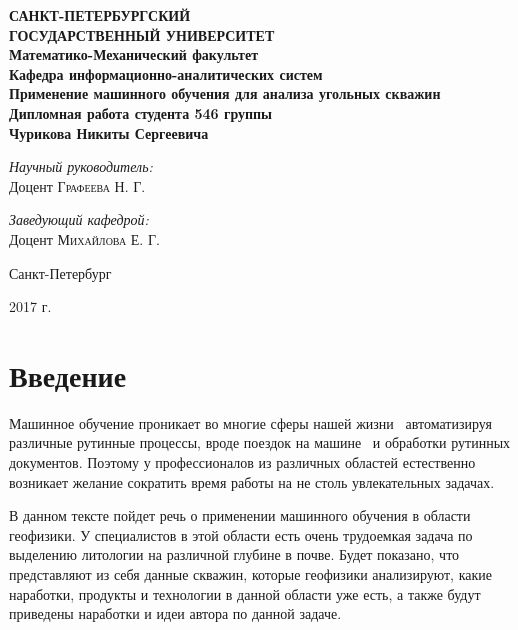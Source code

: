\documentclass[aps,%
12pt,%
final,%
oneside,
onecolumn,%
musixtex, %
superscriptaddress,%
centertags]{article} %
\begin{document}
\begin{titlepage}
\begin{center}
\textbf{\Large САНКТ-ПЕТЕРБУРГСКИЙ \\ ГОСУДАРСТВЕННЫЙ УНИВЕРСИТЕТ} \\[1.0cm]
\textbf{\large Математико-Механический факультет} \\[0.2cm]
\textbf{\large Кафедра информационно-аналитических систем}\\[3.5cm]

\textbf{\LARGE Применение машинного обучения для анализа угольных скважин}\\[1.0cm]
\textbf{\Large Дипломная работа студента 546 группы} \\[0.2cm]
\textbf{\Large Чурикова Никиты Сергеевича} \\[3.5cm]

\begin{flushright} \large
\emph{Научный руководитель:} \\
Доцент \textsc{Графеева Н. Г.}
\end{flushright}
\begin{flushright} \large
\emph{Заведующий кафедрой:} \\
Доцент \textsc{Михайлова Е. Г.}
\end{flushright}
\vfill

{\large {Санкт-Петербург}} \par
{\large {2017 г.}}
\end{center}
\end{titlepage}

\tableofcontents

\section{Введение}
Машинное обучение проникает во многие сферы нашей жизни~\cite{overview-of-ml} автоматизируя
различные рутинные процессы, вроде поездок на машине~\cite{ai-cars} и обработки рутинных документов.
Поэтому у профессионалов из различных областей естественно возникает желание сократить время работы
на не столь увлекательных задачах.

В данном тексте пойдет речь о применении машинного обучения в области геофизики. У специалистов
в этой области есть очень трудоемкая задача по выделению литологии на различной глубине в почве.
Будет показано, что представляют из себя данные скважин, которые геофизики анализируют, какие
наработки, продукты и технологии в данной области уже есть, а также будут приведены наработки и
идеи автора по данной задаче.
\end{document}
